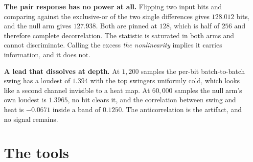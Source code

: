 \textbf{The pair response has no power at all.} Flipping two input bits and comparing against the exclusive-or of the two single differences gives \(128.012\) bits, and the null arm gives \(127.938\). Both are pinned at \(128\), which is half of \(256\) and therefore complete decorrelation. The statistic is saturated in both arms and cannot discriminate. Calling the excess \emph{the nonlinearity} implies it carries information, and it does not.

\textbf{A lead that dissolves at depth.} At \(1{,}200\) samples the per-bit batch-to-batch swing has a loudest of \(1.394\) with the top swingers uniformly cold, which looks like a second channel invisible to a heat map. At \(60{,}000\) samples the null arm's own loudest is \(1.3965\), no bit clears it, and the correlation between swing and heat is \(-0.0671\) inside a band of \(0.1250\). The anticorrelation is the artifact, and no signal remains.

\section{The tools}

